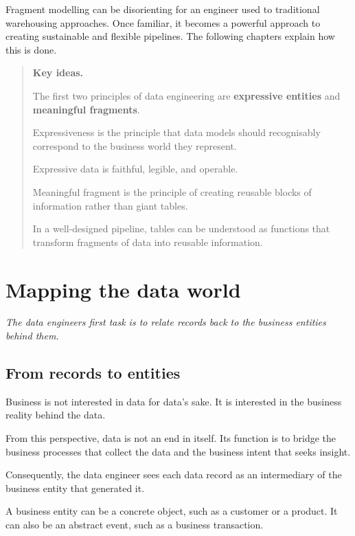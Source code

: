 \documentclass[10pt,openany,10pt]{book}
\begin{document}
Fragment modelling can be disorienting for an engineer used to
traditional warehousing approaches. Once familiar, it becomes a powerful
approach to creating sustainable and flexible pipelines. The following
chapters explain how this is done.

\begin{quote}
\textbf{Key ideas.}

The first two principles of data engineering are \textbf{expressive
entities} and \textbf{meaningful fragments}.

Expressiveness is the principle that data models should recognisably
correspond to the business world they represent.

Expressive data is faithful, legible, and operable.

Meaningful fragment is the principle of creating reusable blocks of
information rather than giant tables.

In a well-designed pipeline, tables can be understood as functions that
transform fragments of data into reusable information.
\end{quote}

\newpage

\chapter{Mapping the data
world}\label{docs-creating-information-mapping-the-data-world}

\emph{The data engineer\textquotesingle s first task is to relate
records back to the business entities behind them.}

\section{From records to entities}\label{from-records-to-entities}

Business is not interested in data for data's sake. It is interested in
the business reality behind the data.

From this perspective, data is not an end in itself. Its function is to
bridge the business processes that collect the data and the business
intent that seeks insight.

Consequently, the data engineer sees each data record as an intermediary
of the business entity that generated it.

A business entity can be a concrete object, such as a customer or a
product. It can also be an abstract event, such as a business
transaction.
\end{document}
